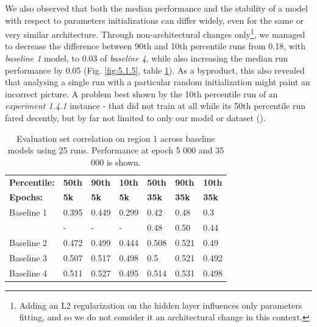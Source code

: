 We also observed that both the median performance and the stability of a model with respect to parameters initializations can differ widely, even for the same or very similar architecture. Through non-architectural changes only\footnote{Adding an L2 regularization on the hidden layer influences only parameters fitting, and so we do not consider it an architectural change in this context.}, we managed to decrease the difference between 90th and 10th percentile runs from 0.18, with \textit{baseline 1} model, to 0.03 of \textit{baseline 4}, while also increasing the median run performance by 0.05 (Fig. \ref{fig:5.1.5}, table \ref{tab:5.1.5}). As a byproduct, this also revealed that analysing a single run with a particular random initialization might paint an incorrect picture. A problem best shown by the 10th percentile run of an \textit{experiment 1.4.1} instance - that did not train at all while its 50th percentile run fared decently, but by far not limited to only our model or dataset (\cite{2019arXiv190910447M}).

\begin{table}[H]
    \renewcommand{\arraystretch}{1.0}
    \centering
    \begin{tabular}{l|l|l|l|l|l|l}
        \toprule
        \textbf{Percentile:} & \textbf{50th} & \textbf{90th} & \textbf{10th} & \textbf{50th} & \textbf{90th} & \textbf{10th} \\
        \textbf{Epochs:} & \textbf{5k} & \textbf{5k} & \textbf{5k} & \textbf{35k} & \textbf{35k}& \textbf{35k} \\ \midrule
        Baseline 1 & 0.395 & 0.449 & 0.299 & 0.42 & 0.48 & 0.3 \\ 
        \citeauthor{antolik} & - & - & - & 0.48 & 0.50 & 0.44 \\ 
        Baseline 2 & 0.472 & 0.499 & 0.444 & 0.508 & 0.521 & 0.49 \\ 
        Baseline 3 & 0.507 & 0.517 & 0.498 & 0.5 & 0.521 & 0.492 \\ 
        Baseline 4 & 0.511 & 0.527 & 0.495 & 0.514 & 0.531 & 0.498 \\ \bottomrule
    \end{tabular}
    \caption[Evaluation of 5k/35k epochs training on region 1]{Evaluation set correlation on region 1 across baseline models using 25 runs. Performance at epoch 5 000 and 35 000 is shown\protect\footnotemark. }
    \label{tab:5.1.5}
    \renewcommand{\arraystretch}{1.0}
\end{table}

